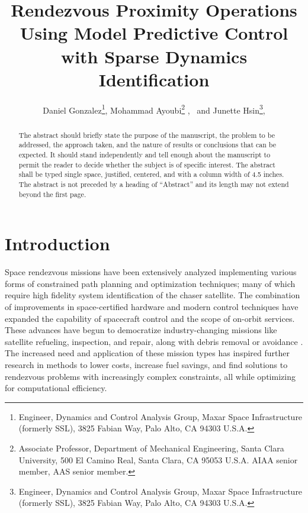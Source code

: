 \documentclass[letterpaper, preprint, paper,11pt]{AAS}	%
\begin{document}
\title{Rendezvous Proximity Operations Using Model Predictive Control with Sparse Dynamics Identification}

\author{Daniel Gonzalez\thanks{Engineer, Dynamics and Control Analysis Group, Maxar Space Infrastructure (formerly SSL), 3825 Fabian Way, Palo Alto, CA 94303 U.S.A.},
	 Mohammad Ayoubi\thanks{Associate Professor, Department of Mechanical Engineering, Santa Clara University, 500 El Camino Real,
	 	Santa Clara, CA 95053 U.S.A. AIAA senior member, AAS senior member.} , 
\ and Junette Hsin\thanks{Engineer, Dynamics and Control Analysis Group, Maxar Space Infrastructure (formerly SSL), 3825 Fabian Way, Palo Alto, CA 94303 U.S.A.}, 
}


\maketitle{} 		


\begin{abstract}
	
The abstract should briefly state the purpose of the manuscript, the problem to be addressed, the approach taken, and the nature of results or conclusions that can be expected. It should stand independently and tell enough about the manuscript to permit the reader to decide whether the subject is of specific interest. The abstract shall be typed single space, justified, centered, and with a column width of 4.5 inches. The abstract is not preceded by a heading of ``Abstract'' and its length may not extend beyond the first page.

\end{abstract}








\section{Introduction}
%

Space rendezvous missions have been extensively analyzed implementing various forms of constrained path planning and optimization techniques; many of which require high fidelity system identification of the chaser satellite. The combination of improvements in space-certified hardware and modern control techniques have expanded the capability of spacecraft control and the scope of on-orbit services. These advances have begun to democratize industry-changing missions like satellite refueling, inspection, and repair, along with debris removal or avoidance \cite{ParkZagaris_AnalysisandExperimention,cairano_park_MPC}. The increased need and application of these mission types has inspired further research in methods to lower costs, increase fuel savings, and find solutions to rendezvous problems with increasingly complex constraints, all while optimizing for computational efficiency.
\end{document}
